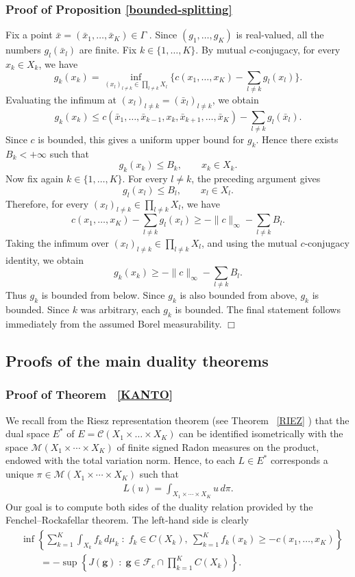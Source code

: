 \documentclass[twoside,11pt,a4paper]{article}
\newcommand*{\SavedRef}{}
\let\SavedRef\ref
\renewcommand*{\ref}[1]{  \begingroup
    \hypersetup{
      linkcolor=linkequation,
      linkbordercolor=linkequation,
    }    \SavedRef{#1}  \endgroup
}
\begin{document}
\subsubsection*{Proof of Proposition \ref{bounded-splitting}}
Fix a point $
\bar x=(\bar x_1,\ldots,\bar x_K)\in \Gamma$ .
Since \((g_1,\ldots,g_K)\) is real-valued, all the numbers
\(g_l(\bar x_l)\) are finite.
Fix \(k\in\{1,\ldots,K\}\). By mutual \(c\)-conjugacy, for every
\(x_k\in X_k\), we have
\[
g_k(x_k)
=
\inf_{(x_l)_{l\ne k}\in \prod_{l\ne k}X_l}
\Big\{
c(x_1,\ldots,x_K)-\sum_{l\ne k}g_l(x_l)
\Big\}.
\]
Evaluating the infimum at $
(x_l)_{l\ne k}=(\bar x_l)_{l\ne k}$,
we obtain
\[
g_k(x_k)
\le
c(\bar x_1,\ldots,\bar x_{k-1},x_k,\bar x_{k+1},\ldots,\bar x_K)
-
\sum_{l\ne k}g_l(\bar x_l).
\]
Since \(c\) is bounded, this gives a uniform upper bound for \(g_k\).
Hence there exists \(B_k<+\infty\) such that
\[
g_k(x_k)\le B_k,
\qquad x_k\in X_k .
\]
Now fix again \(k\in\{1,\ldots,K\}\). For every \(l\ne k\), the preceding
argument gives
\[
g_l(x_l)\le B_l,
\qquad x_l\in X_l .
\]
Therefore, for every \((x_l)_{l\ne k}\in \prod_{l\ne k}X_l\), we have
\[
c(x_1,\ldots,x_K)-\sum_{l\ne k}g_l(x_l)
\ge
-\|c\|_\infty-\sum_{l\ne k}B_l .
\]
Taking the infimum over \((x_l)_{l\ne k}\in \prod_{l\ne k}X_l\), and using
the mutual \(c\)-conjugacy identity, we obtain
\[
g_k(x_k)
\ge
-\|c\|_\infty-\sum_{l\ne k}B_l .
\]
Thus \(g_k\) is bounded from below. Since \(g_k\) is also bounded from above,
\(g_k\) is bounded.
Since \(k\) was arbitrary, each \(g_k\) is bounded. The final statement
follows immediately from the assumed Borel measurability.
\hfill\(\Box\)



\subsection{Proofs of the main duality theorems}\label{proof}


\subsubsection*{Proof of Theorem~\ref{KANTO}}
We recall from the Riesz representation theorem (see Theorem~\ref{RIEZ}) that the dual space \(E^{\ast}\) of $E=\mathcal{C}(X_1\times\ldots\times X_K)$ can be
identified isometrically with the space 
\(\mathcal{M}(X_{1}\times\cdots\times X_{K})\) of finite
signed Radon measures on the product, endowed with the total variation norm. Hence, to each \(L\in E^{\ast}\) corresponds a unique
\(\pi\in \mathcal{M}(X_{1}\times\cdots\times X_{K})\) such that
\begin{align*}
L(u)=\int_{X_{1}\times\cdots\times X_{K}} u\, d\pi.
\end{align*}
Our goal is to compute both sides of the duality relation provided by the Fenchel--Rockafellar theorem. The left-hand side is clearly
\begin{align*}
&\inf\left\{
\sum_{k=1}^{K} \int_{X_k} f_k\,d\mu_k
\;:\;
f_k\in C(X_k),\ 
\sum_{k=1}^{K} f_k(x_k)\ge -c(x_1,\ldots,x_K)
\right\}
\\
&\qquad =
-\sup\left\{
J(\boldsymbol g)
\;:\;
\boldsymbol g\in \mathcal F_c\cap \prod_{k=1}^{K} C(X_k)
\right\}.
\end{align*}
\end{document}
